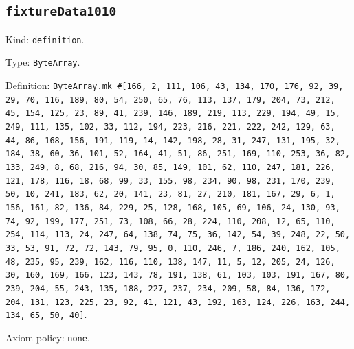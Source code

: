 \documentclass[11pt]{article}
\begin{document}
\subsection*{\texttt{fixtureData1010}}
\noindent Kind: \texttt{definition}.\par
\noindent Type: \texttt{ByteArray}.\par
\noindent Definition: \texttt{ByteArray.mk \#[166, 2, 111, 106, 43, 134, 170, 176, 92, 39, 29, 70, 116, 189, 80, 54, 250, 65, 76, 113, 137, 179, 204, 73, 212, 45, 154, 125, 23, 89, 41, 239, 146, 189, 219, 113, 229, 194, 49, 15, 249, 111, 135, 102, 33, 112, 194, 223, 216, 221, 222, 242, 129, 63, 44, 86, 168, 156, 191, 119, 14, 142, 198, 28, 31, 247, 131, 195, 32, 184, 38, 60, 36, 101, 52, 164, 41, 51, 86, 251, 169, 110, 253, 36, 82, 133, 249, 8, 68, 216, 94, 30, 85, 149, 101, 62, 110, 247, 181, 226, 121, 178, 116, 18, 68, 99, 33, 155, 98, 234, 90, 98, 231, 170, 239, 50, 10, 241, 183, 62, 20, 141, 23, 81, 27, 210, 181, 167, 29, 6, 1, 156, 161, 82, 136, 84, 229, 25, 128, 168, 105, 69, 106, 24, 130, 93, 74, 92, 199, 177, 251, 73, 108, 66, 28, 224, 110, 208, 12, 65, 110, 254, 114, 113, 24, 247, 64, 138, 74, 75, 36, 142, 54, 39, 248, 22, 50, 33, 53, 91, 72, 72, 143, 79, 95, 0, 110, 246, 7, 186, 240, 162, 105, 48, 235, 95, 239, 162, 116, 110, 138, 147, 11, 5, 12, 205, 24, 126, 30, 160, 169, 166, 123, 143, 78, 191, 138, 61, 103, 103, 191, 167, 80, 239, 204, 55, 243, 135, 188, 227, 237, 234, 209, 58, 84, 136, 172, 204, 131, 123, 225, 23, 92, 41, 121, 43, 192, 163, 124, 226, 163, 244, 134, 65, 50, 40]}.\par
\noindent Axiom policy: \texttt{none}.\par
\end{document}
